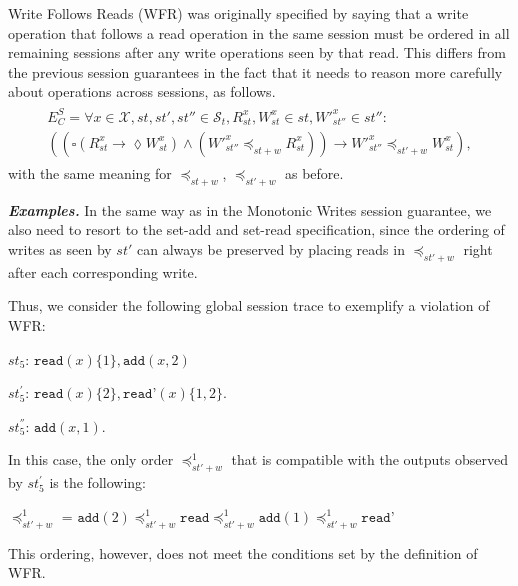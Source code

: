 \documentclass[journal, compsoc]{IEEEtran}
\begin{document}
	Write Follows Reads (WFR)  was originally specified by saying that a write operation that follows a read operation in the same session must be ordered in all remaining sessions after any write operations seen by that read. This differs from the previous session guarantees in the fact that it needs to reason more carefully about operations across sessions, as follows. \\
	\begin{align}\label{eqn:WFR}
	\begin{split}
	E^S_C =    \forall x \in \mathcal{X}, \mathit{st}, \mathit{st'}, \mathit{st''} \in \mathcal{S}_t, R_\mathit{st}^x,  W_\mathit{st}^x \in \mathit{st}, W'^x_\mathit{st''} \in \mathit{st''}:  \\
	\left(  \left(
	\square \left( R^x_{\mathit{st}} \rightarrow \lozenge W^x_{\mathit{st}} \right)
	\wedge
	\left(  W'^x_\mathit{st''} \preccurlyeq_{\mathit{st}+w} R^x_{\mathit{st}} \right)
	\right)
	\rightarrow
	W'^x_{\mathit{st}''} \preccurlyeq_{\mathit{st'}+w} W_{\mathit{st}}^x \right),
	\end{split}
	\end{align}
	with the same meaning for $\preccurlyeq_{\mathit{st}+w}$, $\preccurlyeq_{\mathit{st}'+w}$ as before.
	
	
	\noindent \emph{\textbf{Examples.}}
	In the same way as in the Monotonic Writes session guarantee, we also need to resort to the set-add and set-read specification, since the ordering of writes as seen by $st'$ can always be preserved by placing reads in $\preccurlyeq_{\mathit{st'}+w}$ right after each corresponding write.
	
	Thus, we consider the following global session trace to exemplify a violation of WFR:
	
	
	$\mathit{st}_5$: $\texttt{read}(x){\{1\}},\texttt{add}(x,2)$
	
	$\mathit{st}_5^{'}$: $\texttt{read}(x){\{2\}},\texttt{read'}(x){\{1,2\}}$.
	
	$\mathit{st}_5^{''}$: $\texttt{add}(x,1)$.
	
	In this case, the only order $\preccurlyeq_{\mathit{st'}+w}^1$ that is compatible with the outputs observed by $\mathit{st}_5^{'}$ is the following:
	
	\noindent $\preccurlyeq_{\mathit{st'}+w}^1$ = $\texttt{add}(2) \preccurlyeq_{\mathit{st'}+w}^1 \texttt{read}
	\preccurlyeq_{\mathit{st'}+w}^1  \texttt{add}(1) \preccurlyeq_{\mathit{st'}+w}^1 \texttt{read'}$
	
	This ordering, however, does not meet the conditions set by the definition of WFR.
	
\end{document}
